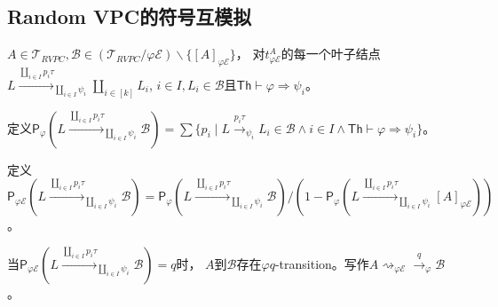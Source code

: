 \subsection{Random VPC的符号互模拟}
\begin{definition}
   $A\in \mathcal{T}_{RVPC},\mathcal{B}\in (\mathcal{T}_{RVPC}/\varphi \mathcal{E})\backslash \{[A]_{\varphi\mathcal{E}}\}$，
对$t^A_{\varphi \mathcal{E}}$的每一个叶子结点$L\stackrel{\coprod_{i\in I}p_i\tau}{\longrightarrow}_{\coprod_{i\in I}\psi_i} \coprod_{i\in [k]}L_i$,
$i\in I, L_i\in \mathcal{B}$且$\mathsf{Th}\vdash \varphi \Rightarrow \psi_i$。

定义$\mathsf{P}_\varphi(L\stackrel{\coprod_{i\in I}p_i\tau}{\longrightarrow}_{\coprod_{i\in I}\psi_i}\mathcal{B}) = \sum\{p_i\mid L\stackrel{p_i\tau}{\rightarrow}_{\psi_i} L_i\in\mathcal{B} \wedge i\in I \wedge \mathsf{Th}\vdash \varphi \Rightarrow \psi_i\}$。

定义$\mathsf{P}_{\varphi \mathcal{E}}(L\stackrel{\coprod_{i\in I}p_i\tau}{\longrightarrow}_{\coprod_{i\in I}\psi_i}\mathcal{B}) = \mathsf{P}_\varphi(L\stackrel{\coprod_{i\in I}p_i\tau}{\longrightarrow}_{\coprod_{i\in I}\psi_i}\mathcal{B})/(1-\mathsf{P}_\varphi(L\stackrel{\coprod_{i\in I}p_i\tau}{\longrightarrow}_{\coprod_{i\in I}\psi_i}[A]_{\varphi\mathcal{E}}))$。

当$\mathsf{P}_{\varphi \mathcal{E}}(L\stackrel{\coprod_{i\in I}p_i\tau}{\longrightarrow}_{\coprod_{i\in I}\psi_i}\mathcal{B})=q$时，
$A$到$\mathcal{B}$存在$\varphi q$-transition。写作$A\rightsquigarrow_{\varphi\mathcal{E}} \stackrel{q}{\rightarrow}_{\varphi} \mathcal{B}$。
\end{definition}


